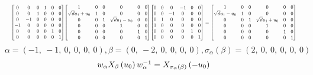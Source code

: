 \documentclass[11pt]{article}
\theoremstyle{definition}
\begin{document}
\[
\scaletoalign{\textwidth}{{\left[\begin{matrix}0 & 0 & 0 & 1 & 0 & 0\\0 & 0 & 1 & 0 & 0 & 0\\0 & -1 & 0 & 0 & 0 & 0\\-1 & 0 & 0 & 0 & 0 & 0\\0 & 0 & 0 & 0 & 1 & 0\\0 & 0 & 0 & 0 & 0 & 1\end{matrix}\right]} {\left[\begin{matrix}1 & 0 & 0 & 0 & 0 & 0\\\sqrt{d} u_{1} + u_{0} & 1 & 0 & 0 & 0 & 0\\0 & 0 & 1 & \sqrt{d} u_{1} - u_{0} & 0 & 0\\0 & 0 & 0 & 1 & 0 & 0\\0 & 0 & 0 & 0 & 1 & 0\\0 & 0 & 0 & 0 & 0 & 1\end{matrix}\right]} {\left[\begin{matrix}0 & 0 & 0 & -1 & 0 & 0\\0 & 0 & -1 & 0 & 0 & 0\\0 & 1 & 0 & 0 & 0 & 0\\1 & 0 & 0 & 0 & 0 & 0\\0 & 0 & 0 & 0 & 1 & 0\\0 & 0 & 0 & 0 & 0 & 1\end{matrix}\right]} = {\left[\begin{matrix}1 & 0 & 0 & 0 & 0 & 0\\\sqrt{d} u_{1} - u_{0} & 1 & 0 & 0 & 0 & 0\\0 & 0 & 1 & \sqrt{d} u_{1} + u_{0} & 0 & 0\\0 & 0 & 0 & 1 & 0 & 0\\0 & 0 & 0 & 0 & 1 & 0\\0 & 0 & 0 & 0 & 0 & 1\end{matrix}\right]}}
\]
\[
\alpha = \left( -1, \  -1, \  0, \  0, \  0, \  0\right), \beta = \left( 0, \  -2, \  0, \  0, \  0, \  0\right), \sigma_{\alpha}(\beta) = \left( 2, \  0, \  0, \  0, \  0, \  0\right)
\]
\[
\scaletoalign{\textwidth}{w_{\alpha} X_{\beta}\left(u_{0}\right) w_{\alpha}^{-1} = X_{\sigma_{\alpha}\left(\beta\right)}\left(- u_{0}\right)}
\]
\end{document}
